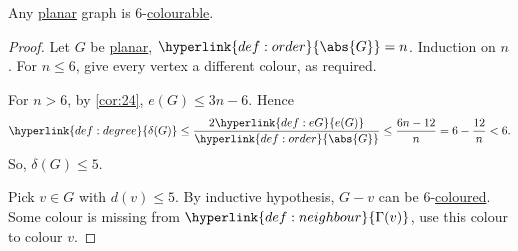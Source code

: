 \documentclass{article}
\begin{document}
\begin{nprop}\label{prop:25}
    Any \hyperlink{def:drawing}{planar} graph is 6-\hyperlink{def:colour}{colourable}.
\end{nprop}

\begin{proof}
    Let $G$ be \hyperlink{def:drawing}{planar}, $\hyperlink{def:order}{\abs{G}} = n$. Induction on $n$.
    For $n \leq 6$, give every vertex a different colour, as required.

    For $n > 6$, by \cref{cor:24}, $e(G) \leq 3n - 6$. Hence
    \begin{equation*}
        \hyperlink{def:degree}{\delta(G)} \leq \frac{2 \hyperlink{def:eG}{e(G)}}{\hyperlink{def:order}{\abs{G}}} \leq \frac{6n-12}{n} = 6 - \frac{12}{n} < 6.
    \end{equation*}
    So, $\delta(G) \leq 5$.

    Pick $v \in G$ with $d(v) \leq 5$. By inductive hypothesis, $G- v$ can be 6-\hyperlink{def:colour}{coloured}.
    Some colour is missing from $\hyperlink{def:neighbour}{\Gamma(v)}$, use this colour to colour $v$.
\end{proof}
\end{document}
